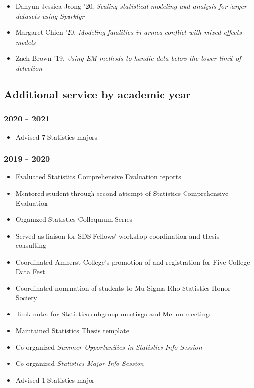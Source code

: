 \documentclass[
  fleqn, oneside]{article}
\providecommand{\tightlist}{%
  \setlength{\itemsep}{0pt}\setlength{\parskip}{0pt}}
\begin{document}
\begin{itemize}
\tightlist
\item
  Dahyun Jessica Jeong '20, \emph{Scaling statistical modeling and
  analysis for larger datasets using Sparklyr}
\item
  Margaret Chien '20, \emph{Modeling fatalities in armed conflict with
  mixed effects models}
\item
  Zach Brown '19, \emph{Using EM methods to handle data below the lower
  limit of detection}
\end{itemize}

\hypertarget{additional-service-by-academic-year}{%
\subsection{Additional service by academic
year}\label{additional-service-by-academic-year}}

\hypertarget{section}{%
\subsubsection{2020 - 2021}\label{section}}

\begin{itemize}
\tightlist
\item
  Advised 7 Statistics majors 
\end{itemize}

\hypertarget{section-1}{%
\subsubsection{2019 - 2020}\label{section-1}}

\begin{itemize}
\tightlist
\item
  Evaluated Statistics Comprehensive Evaluation reports
\item
  Mentored student through second attempt of Statistics Comprehensive
  Evaluation
\item
  Organized Statistics Colloquium Series
\item
  Served as liaison for SDS Fellows' workshop coordination and thesis
  consulting
\item
  Coordinated Amherst College's promotion of and registration for Five
  College Data Fest
\item
  Coordinated nomination of students to Mu Sigma Rho Statistics Honor
  Society
\item
  Took notes for Statistics subgroup meetings and Mellon meetings
\item
  Maintained Statistics Thesis template
\item
  Co-organized \emph{Summer Opportunities in Statistics Info Session}
\item
  Co-organized \emph{Statistics Major Info Session}
\item
  Advised 1 Statistics major
\end{itemize}
\end{document}
